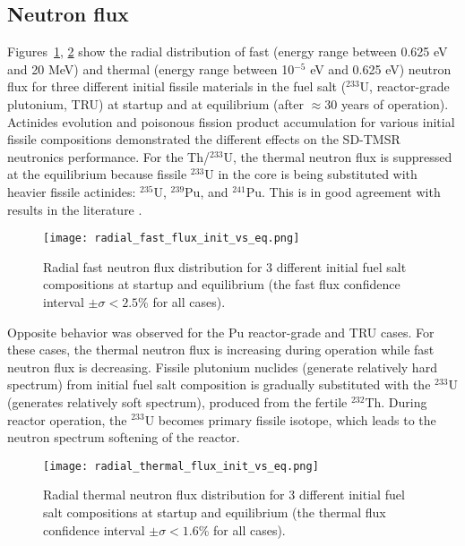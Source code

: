 \subsection{Neutron flux}
Figures~\ref{fig:fast_flux}, \ref{fig:thermal_flux} show the radial 
distribution of fast (energy range between 0.625 eV and 20 MeV) and thermal 
(energy range between 10$^{-5}$ eV and 0.625 eV) neutron flux for three 
different initial fissile materials in the fuel salt ($^{233}$U, reactor-grade 
plutonium, TRU) at startup and at equilibrium (after $\approx 30$ years of 
operation). Actinides evolution and poisonous fission product accumulation 
for various initial fissile compositions demonstrated the different effects on 
the SD-TMSR neutronics performance. For the Th/$^{233}$U, the thermal neutron 
flux is suppressed at the equilibrium because fissile $^{233}$U in the core is 
being substituted with heavier fissile actinides: $^{235}$U, $^{239}$Pu, and 
$^{241}$Pu. This is in good agreement with results in the literature 
\cite{rykhlevskii2019modeling, ashraf2019whole_core}.
\begin{figure}[htp!] %
	\texttt{[image: radial\_fast\_flux\_init\_vs\_eq.png]} 
	\caption{Radial fast neutron flux distribution for 3 different initial 
		fuel salt compositions at startup and equilibrium (the fast flux 
		confidence interval $\pm\sigma<2.5$\% for all cases).}
	\label{fig:fast_flux}
\end{figure}

Opposite behavior was observed for the Pu reactor-grade and TRU cases. For 
these cases, the thermal neutron flux is increasing during operation while 
fast neutron flux is decreasing. Fissile plutonium nuclides (generate 
relatively hard spectrum) from initial fuel salt composition is gradually 
substituted with the $^{233}$U (generates relatively soft spectrum), produced 
from the fertile $^{232}$Th. During reactor operation, the $^{233}$U becomes 
primary fissile isotope, which leads to the neutron spectrum softening of the 
reactor. 
\begin{figure}[htp!] %
	\texttt{[image: radial\_thermal\_flux\_init\_vs\_eq.png]} 
	\caption{Radial thermal neutron flux distribution for 3 different initial 
		fuel salt compositions at startup and equilibrium (the thermal flux 
		confidence interval $\pm\sigma<1.6$\% for all cases).}
	\label{fig:thermal_flux}
\end{figure}


